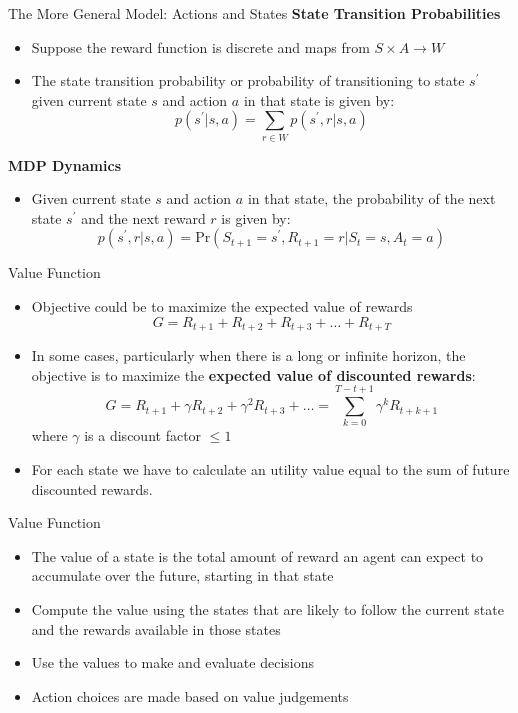 \documentclass[11pt]{beamer}
\begin{document}
\begin{frame}{The More General Model: Actions and States}
\textbf{State Transition Probabilities}
	\begin{itemize}
		\item Suppose the reward function is discrete and maps from $S \times A \rightarrow W$
		\item The state transition probability or probability of transitioning to state $s^\prime$ given current state $s$ and action $a$ in that state is given by: \begin{equation} p \left( s^\prime \vert s,a \right) = \sum\limits_{r \in W} p \left( s^\prime, r \vert s,a \right)\end{equation}
	\end{itemize}
\textbf{MDP Dynamics}
	\begin{itemize}
		\item Given current state $s$ and action $a$ in that state, the probability of the next state $s^\prime$ and the next reward $r$ is given by: \begin{equation} p\left( s^\prime, r \vert s,a \right) = \text{Pr} \left( S_{t+1}=s^\prime, R_{t+1} = r \vert S_t =s, A_t = a \right)\end{equation}
	\end{itemize}
	
\end{frame}
\begin{frame}{Value Function}
	\begin{itemize}
		\item Objective could be to maximize the expected value of rewards
		$$G=R_{t+1}+R_{t+2}+R_{t+3}+\dots+R_{t+T}$$
		\item In some cases, particularly when there is a long or infinite horizon, the objective is to maximize the \textbf{expected value of discounted rewards}:
\begin{equation}
G=R_{t+1}+\gamma R_{t+2}+ \gamma^2R_{t+3}+\dots = \sum\limits_{k=0}^{T-t+1} \gamma^k R_{t+k+1}
\end{equation}
		where $\gamma$ is a discount factor $\le 1$
	\item For each state we have to calculate an utility value equal to the sum of future discounted rewards.	
	\end{itemize}
\end{frame}
\begin{frame}{Value Function}
	\begin{itemize}
		\item The value of a state is the total amount of reward an agent can expect to accumulate over the future, starting in that state
		\item Compute the value using the states that are likely to follow the current state and the rewards available in those states
		\item Use the values to make and evaluate decisions
		\item Action choices are made based on value judgements
	\end{itemize}
\end{frame}
\end{document}
